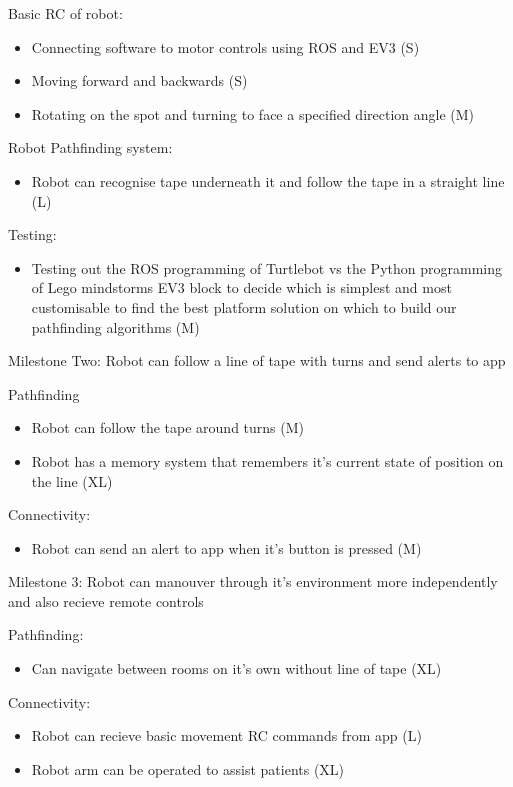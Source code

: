 \documentclass{article}
\begin{document}
Basic RC of robot:
\begin{itemize}
\item Connecting software to motor controls using ROS and EV3 (S)
\item Moving forward and backwards (S)
\item Rotating on the spot and turning to face a specified direction angle (M)
\end{itemize}
Robot Pathfinding system:
\begin{itemize}
\item Robot can recognise tape underneath it and follow the tape in a straight line (L)
\end{itemize}
Testing:
\begin{itemize}
\item Testing out the ROS programming of Turtlebot vs the Python programming of Lego mindstorms EV3 block to decide which is simplest and most customisable to find the best platform solution on which to build our pathfinding algorithms (M)
\end{itemize}

Milestone Two: Robot can follow a line of tape with turns and send alerts to app 

Pathfinding
\begin{itemize}
\item Robot can follow the tape around turns (M)
\item Robot has a memory system that remembers it's current state of position on the line (XL)
\end{itemize}
Connectivity:
\begin{itemize}
\item Robot can send an alert to app when it's button is pressed (M) 
\end{itemize}

Milestone 3: Robot can manouver through it's environment more independently and also recieve remote controls
    
Pathfinding:
\begin{itemize}
\item Can navigate between rooms on it's own without line of tape (XL)
\end{itemize}    
Connectivity:
\begin{itemize}
\item Robot can recieve basic movement RC commands from app (L)
\item Robot arm can be operated to assist patients (XL)   
\end{itemize}
    
\end{document}
